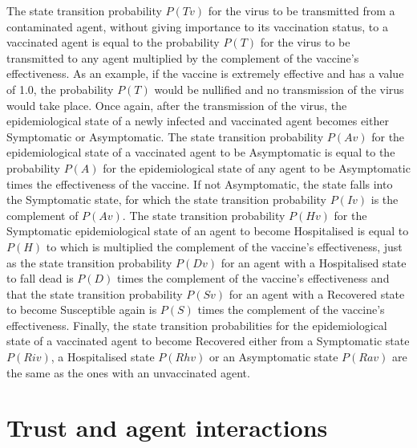 The state transition probability $P(Tv)$ for the virus to be transmitted from a contaminated agent, without giving importance to its vaccination status, to a vaccinated agent is equal to the probability $P(T)$ for the virus to be transmitted to any agent multiplied by the complement of the vaccine's effectiveness. As an example, if the vaccine is extremely effective and has a value of 1.0, the probability $P(T)$ would be nullified and no transmission of the virus would take place. Once again, after the transmission of the virus, the epidemiological state of a newly infected and vaccinated agent becomes either Symptomatic or Asymptomatic. The state transition probability $P(Av)$ for the epidemiological state of a vaccinated agent to be Asymptomatic is equal to the probability $P(A)$ for the epidemiological state of any agent to be Asymptomatic times the effectiveness of the vaccine. If not Asymptomatic, the state falls into the Symptomatic state, for which the state transition probability $P(Iv)$ is the complement of $P(Av)$. The state transition probability $P(Hv)$ for the Symptomatic epidemiological state of an agent to become Hospitalised is equal to $P(H)$ to which is multiplied the complement of the vaccine's effectiveness, just as the state transition probability $P(Dv)$ for an agent with a Hospitalised state to fall dead is $P(D)$ times the complement of the vaccine's effectiveness and that the state transition probability $P(Sv)$ for an agent with a Recovered state to become Susceptible again is $P(S)$ times the complement of the vaccine's effectiveness. Finally, the state transition probabilities for the epidemiological state of a vaccinated agent to become Recovered either from a Symptomatic state $P(Riv)$, a Hospitalised state $P(Rhv)$ or an Asymptomatic state $P(Rav)$ are the same as the ones with an unvaccinated agent.

\section{Trust and agent interactions}
\label{trust_agent_interactions}

